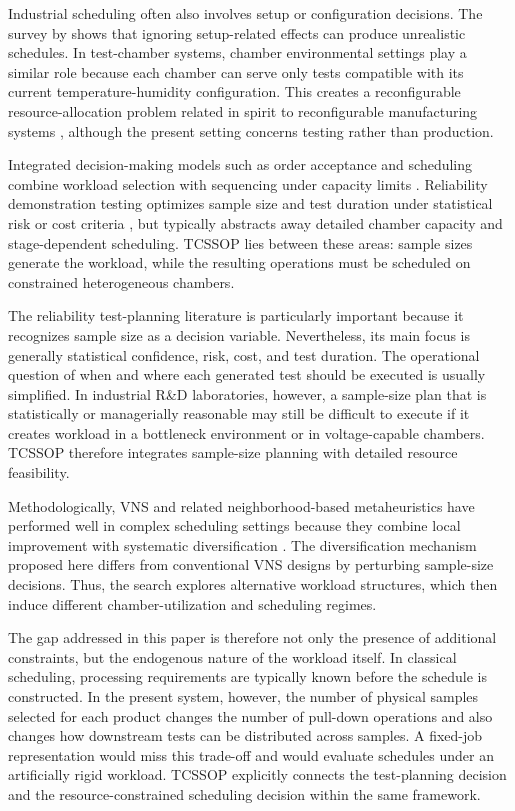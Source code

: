 \documentclass[11pt]{article}
\begin{document}
Industrial scheduling often also involves setup or configuration decisions. The survey by \citet{Allahverdi2015} shows that ignoring setup-related effects can produce unrealistic schedules. In test-chamber systems, chamber environmental settings play a similar role because each chamber can serve only tests compatible with its current temperature-humidity configuration. This creates a reconfigurable resource-allocation problem related in spirit to reconfigurable manufacturing systems \citep{Koren1999,MehrabiUlsoyKoren2000}, although the present setting concerns testing rather than production.

Integrated decision-making models such as order acceptance and scheduling combine workload selection with sequencing under capacity limits \citep{Slotnick2011,WangYe2019}. Reliability demonstration testing optimizes sample size and test duration under statistical risk or cost criteria \citep{Fernandez2022}, but typically abstracts away detailed chamber capacity and stage-dependent scheduling. TCSSOP lies between these areas: sample sizes generate the workload, while the resulting operations must be scheduled on constrained heterogeneous chambers.

The reliability test-planning literature is particularly important because it recognizes sample size as a decision variable. Nevertheless, its main focus is generally statistical confidence, risk, cost, and test duration. The operational question of when and where each generated test should be executed is usually simplified. In industrial R\&D laboratories, however, a sample-size plan that is statistically or managerially reasonable may still be difficult to execute if it creates workload in a bottleneck environment or in voltage-capable chambers. TCSSOP therefore integrates sample-size planning with detailed resource feasibility.

Methodologically, VNS and related neighborhood-based metaheuristics have performed well in complex scheduling settings because they combine local improvement with systematic diversification \citep{MejiaYuraszeck2020}. The diversification mechanism proposed here differs from conventional VNS designs by perturbing sample-size decisions. Thus, the search explores alternative workload structures, which then induce different chamber-utilization and scheduling regimes.

The gap addressed in this paper is therefore not only the presence of additional constraints, but the endogenous nature of the workload itself. In classical scheduling, processing requirements are typically known before the schedule is constructed. In the present system, however, the number of physical samples selected for each product changes the number of pull-down operations and also changes how downstream tests can be distributed across samples. A fixed-job representation would miss this trade-off and would evaluate schedules under an artificially rigid workload. TCSSOP explicitly connects the test-planning decision and the resource-constrained scheduling decision within the same framework.
\end{document}
